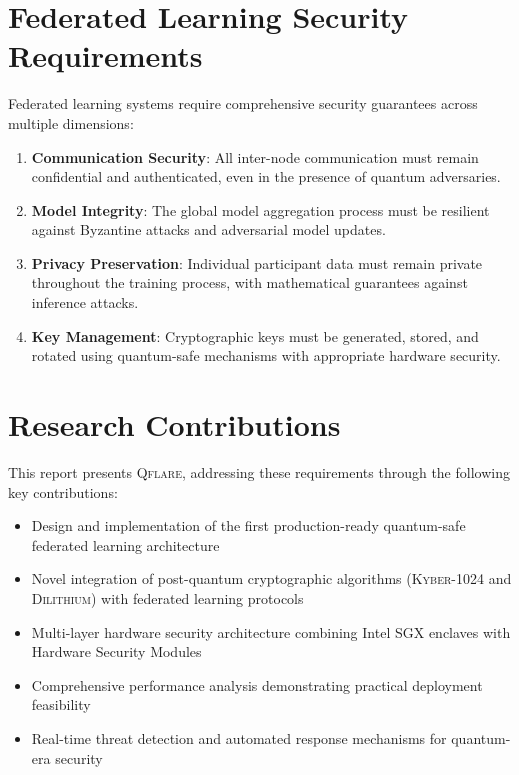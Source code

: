 ﻿\documentclass[12pt,a4paper,twoside]{book}
\newcommand{\qflare}{\textsc{Qflare}}
\newcommand{\kyber}{\textsc{Kyber}}
\newcommand{\dilithium}{\textsc{Dilithium}}
\begin{document}
\section{Federated Learning Security Requirements}
\label{sec:fl-security}

Federated learning systems require comprehensive security guarantees across multiple dimensions:

\begin{enumerate}
\item \textbf{Communication Security}: All inter-node communication must remain confidential and authenticated, even in the presence of quantum adversaries.
\item \textbf{Model Integrity}: The global model aggregation process must be resilient against Byzantine attacks and adversarial model updates.
\item \textbf{Privacy Preservation}: Individual participant data must remain private throughout the training process, with mathematical guarantees against inference attacks.
\item \textbf{Key Management}: Cryptographic keys must be generated, stored, and rotated using quantum-safe mechanisms with appropriate hardware security.
\end{enumerate}

\section{Research Contributions}
\label{sec:contributions}

This report presents \qflare{}, addressing these requirements through the following key contributions:

\begin{itemize}
\item Design and implementation of the first production-ready quantum-safe federated learning architecture
\item Novel integration of post-quantum cryptographic algorithms (\kyber{}-1024 and \dilithium{}) with federated learning protocols
\item Multi-layer hardware security architecture combining Intel SGX enclaves with Hardware Security Modules
\item Comprehensive performance analysis demonstrating practical deployment feasibility
\item Real-time threat detection and automated response mechanisms for quantum-era security
\end{itemize}
\end{document}
